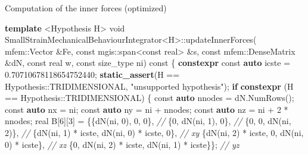 \documentclass{beamer}
\newenvironment{Shaded}{}{}
\newcommand{\AttributeTok}[1]{\textcolor[rgb]{0.49,0.56,0.16}{#1}}
\newcommand{\CommentTok}[1]{\textcolor[rgb]{0.38,0.63,0.69}{\textit{#1}}}
\newcommand{\ControlFlowTok}[1]{\textcolor[rgb]{0.00,0.44,0.13}{\textbf{#1}}}
\newcommand{\DataTypeTok}[1]{\textcolor[rgb]{0.56,0.13,0.00}{#1}}
\newcommand{\DecValTok}[1]{\textcolor[rgb]{0.25,0.63,0.44}{#1}}
\newcommand{\FloatTok}[1]{\textcolor[rgb]{0.25,0.63,0.44}{#1}}
\newcommand{\KeywordTok}[1]{\textcolor[rgb]{0.00,0.44,0.13}{\textbf{#1}}}
\newcommand{\NormalTok}[1]{#1}
\newcommand{\StringTok}[1]{\textcolor[rgb]{0.25,0.44,0.63}{#1}}
\begin{document}
\begin{frame}[fragile]{Computation of the inner forces (optimized)}
\protect\hypertarget{computation-of-the-inner-forces-optimized}{}
\begin{Shaded}
\begin{Highlighting}[]
  \KeywordTok{template}\NormalTok{ \textless{}Hypothesis H\textgreater{}}
  \DataTypeTok{void}\NormalTok{ SmallStrainMechanicalBehaviourIntegrator\textless{}H\textgreater{}::updateInnerForces(}
\NormalTok{      mfem::Vector \&Fe,}
      \AttributeTok{const}\NormalTok{ mgis::span\textless{}}\AttributeTok{const}\NormalTok{ real\textgreater{} \&s,}
      \AttributeTok{const}\NormalTok{ mfem::DenseMatrix \&dN,}
      \AttributeTok{const}\NormalTok{ real w,}
      \AttributeTok{const} \DataTypeTok{size\_type}\NormalTok{ ni) }\AttributeTok{const}\NormalTok{ \{}
    \KeywordTok{constexpr} \AttributeTok{const} \KeywordTok{auto}\NormalTok{ icste = }\FloatTok{0.70710678118654752440}\NormalTok{;}
    \KeywordTok{static\_assert}\NormalTok{(H == Hypothesis::TRIDIMENSIONAL, }\StringTok{"unsupported hypothesis"}\NormalTok{);}
    \ControlFlowTok{if} \KeywordTok{constexpr}\NormalTok{ (H == Hypothesis::TRIDIMENSIONAL) \{}
      \AttributeTok{const} \KeywordTok{auto}\NormalTok{ nnodes = dN.NumRows();}
      \AttributeTok{const} \KeywordTok{auto}\NormalTok{ nx = ni;}
      \AttributeTok{const} \KeywordTok{auto}\NormalTok{ ny = ni + nnodes;}
      \AttributeTok{const} \KeywordTok{auto}\NormalTok{ nz = ni + }\DecValTok{2}\NormalTok{ * nnodes;}
\NormalTok{      real B[}\DecValTok{6}\NormalTok{][}\DecValTok{3}\NormalTok{] = \{\{dN(ni, }\DecValTok{0}\NormalTok{), }\DecValTok{0}\NormalTok{, }\DecValTok{0}\NormalTok{\},                          }\CommentTok{//}
\NormalTok{                      \{}\DecValTok{0}\NormalTok{, dN(ni, }\DecValTok{1}\NormalTok{), }\DecValTok{0}\NormalTok{\},                          }\CommentTok{//}
\NormalTok{                      \{}\DecValTok{0}\NormalTok{, }\DecValTok{0}\NormalTok{, dN(ni, }\DecValTok{2}\NormalTok{)\},                          }\CommentTok{//}
\NormalTok{                      \{dN(ni, }\DecValTok{1}\NormalTok{) * icste, dN(ni, }\DecValTok{0}\NormalTok{) * icste, }\DecValTok{0}\NormalTok{\},  }\CommentTok{// xy}
\NormalTok{                      \{dN(ni, }\DecValTok{2}\NormalTok{) * icste, }\DecValTok{0}\NormalTok{, dN(ni, }\DecValTok{0}\NormalTok{) * icste\},  }\CommentTok{// xz}
\NormalTok{                      \{}\DecValTok{0}\NormalTok{, dN(ni, }\DecValTok{2}\NormalTok{) * icste, dN(ni, }\DecValTok{1}\NormalTok{) * icste\}\}; }\CommentTok{// yz}

\end{Highlighting}
\end{Shaded}
\end{frame}
\end{document}
